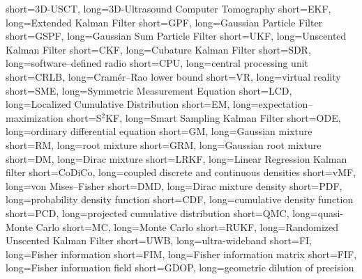 	{short={3D-USCT},	  	  long={3D-Ultrasound Computer Tomography}}
		{short={EKF},	    	    long={Extended Kalman Filter}}
		{short={GPF},	    	long={Gaussian Particle Filter}}
		{short={GSPF},	    	long={Gaussian Sum Particle Filter}}
		{short={UKF},	    	    long={Unscented Kalman Filter}}
		{short={CKF},	    	long={Cubature Kalman Filter}}
		{short={SDR},	    	    long={software--defined radio}}
		{short={CPU},	    	    long={central processing unit}}
		{short={CRLB},	    	  long={Cramér--Rao lower bound}}
		  {short={VR},	    	    long={virtual reality}}
		{short={SME},	    	    long={Symmetric Measurement Equation}}
		{short={LCD},	    	    long={Localized Cumulative Distribution}}
	    {short={EM},	    	    long={expectation--maximization}}
	  {short={S$^2$KF},	      long={Smart Sampling Kalman Filter}}
	  {short={ODE},	    	    long={ordinary differential equation}}
	    {short={GM},	    	    long={Gaussian mixture}}
	    {short={RM},	    	    long={root mixture}}
	    {short={GRM},	    	    long={Gaussian root mixture}}
	    {short={DM},	    	    long={Dirac mixture}}
	  {short={LRKF},	    	  long={Linear Regression Kalman filter}}
	{short={CoDiCo},	      long={coupled discrete and continuous densities}} 
		{short={vMF},	    	    long={von Mises--Fisher}}
		{short={DMD},	    	    long={Dirac mixture density}}
		{short={PDF},	    	    long={probability density function}}
		{short={CDF},	    	    long={cumulative density function}}
		{short={PCD},	    	    long={projected cumulative distribution}}
		{short={QMC},	    	    long={quasi-Monte Carlo}}
		{short={MC},	    	    long={Monte Carlo}}
		{short={RUKF},	    	  long={Randomized Unscented Kalman Filter}}
		{short={UWB},	    	    long={ultra-wideband}}
		   {short={FI},	    	       long={Fisher information}}
		{short={FIM},	    	    long={Fisher information matrix}}
		{short={FIF},	    	long={Fisher information field}}
		{short={GDOP},	    	long={geometric dilution of precision}}
